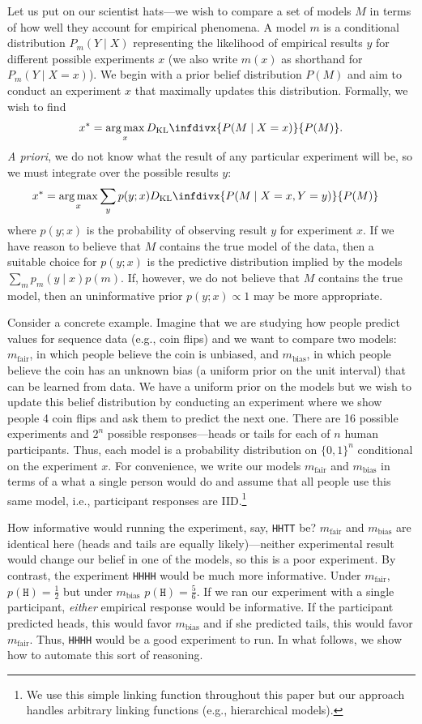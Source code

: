 \documentclass{article}
\newcommand{\dkl}{D_\mathrm{KL}\infdivx}
\DeclareMathOperator*{\argmax}{arg\,max}
\begin{document}
Let us put on our scientist hats---we wish to compare a set of models $M$ in terms of how well they account for empirical phenomena.
A model $m$ is a conditional distribution $P_m(Y \mid X)$ representing the likelihood of empirical results $y$ for different possible experiments $x$ (we also write $m(x)$ as shorthand for $P_m(Y \mid X = x)$).
We begin with a prior belief distribution $P(M)$ and aim to conduct an experiment $x$ that maximally updates this distribution.
Formally, we wish to find
$$x^{*} = \argmax_{x} \dkl{ P(M \mid X = x) }{ P(M) }.$$
\emph{A priori}, we do not know what the result of any particular experiment will be, so we must integrate over the possible results $y$:
\begin{align}
  x^{*} &= \argmax_{x} \sum\limits_{y}p(y ; x) \dkl{ P(M \mid X = x, Y = y) }{ P(M) }  \label{eq:oed}
\end{align}
where $p(y ; x)$ is the probability of observing result $y$ for experiment $x$.
If we have reason to believe that $M$ contains the true model of the data, then a suitable choice for $p(y ; x)$ is the predictive distribution implied by the models $ \sum\limits_{m}p_m(y \mid x)p(m) $.
If, however, we do not believe that $M$ contains the true model, then an uninformative prior $p(y ; x) \propto 1$ may be more appropriate.

Consider a concrete example.
Imagine that we are studying how people predict values for sequence data (e.g., coin flips) and we want to compare two models: $m_{\text{fair}}$, in which people believe the coin is unbiased, and $m_{\text{bias}}$, in which people believe the coin has an unknown bias (a uniform prior on the unit interval) that can be learned from data.
We have a uniform prior on the models but we wish to update this belief distribution by conducting an experiment where we show people 4 coin flips and ask them to predict the next one.
There are 16 possible experiments and $2^n$ possible responses---heads or tails for each of $n$ human participants.
Thus, each model is a probability distribution on $\{0,1\}^n$ conditional on the experiment $x$.
For convenience, we write our models $m_{\text{fair}}$ and $m_{\text{bias}}$ in terms of a what a single person would do and assume that all people use this same model, i.e., participant responses are IID.\footnote{We use this simple linking function throughout this paper but our approach handles arbitrary linking functions (e.g., hierarchical models).}

How informative would running the experiment, say, \lstinline{HHTT} be?
$m_{\text{fair}}$ and $m_{\text{bias}}$ are identical here (heads and tails are equally likely)---neither experimental result would change our belief in one of the models, so this is a poor experiment.
By contrast, the experiment \lstinline{HHHH} would be much more informative.
Under $m_{\text{fair}}$, $p(\texttt{H}) = \frac{1}{2}$ but under $m_{\text{bias}}$ $p(\texttt{H}) = \frac{5}{6}$.
If we ran our experiment with a single participant, \emph{either} empirical response would be informative.
If the participant predicted heads, this would favor $m_{\text{bias}}$ and if she predicted tails, this would favor $m_{\text{fair}}$.
Thus, \lstinline{HHHH} would be a good experiment to run.
In what follows, we show how to automate this sort of reasoning.
\end{document}
